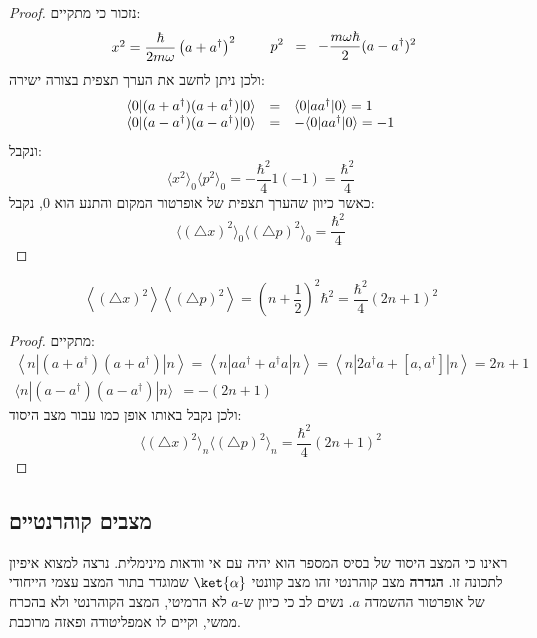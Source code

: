 \documentclass{tstextbook}
\begin{document}
\begin{proof}
נזכור כי מתקיים:
$$\begin{array}{c c l}{{x^{2}}}={{\displaystyle\frac{\hbar}{2m\omega}\left( a+a^{\dagger} \right)^{2}}}\end{array}\qquad p^{2}\;\;=\;\;-\frac{m\omega\hbar}2(a-a^{\dagger})^{2}$$
ולכן ניתן לחשב את הערך תצפית בצורה ישירה:
$$\begin{array}{l c l}{{\langle0|(a+a^{\dagger})(a+a^{\dagger})|0\rangle}}&{{=}}&{{\langle0|a a^{\dagger}|0\rangle=1}}\\ {{\langle0|(a-a^{\dagger})(a-a^{\dagger})|0\rangle}}&{{=}}&{{-\langle0|a a^{\dagger}|0\rangle=-1}}\end{array}$$
ונקבל:
$$\langle x^{2}\rangle_{0}\langle p^{2}\rangle_{0}=-\frac{\hbar^{2}}{4}1(-1)=\frac{\hbar^{2}}{4}$$
כאשר כיוון שהערך תצפית של אופרטור המקום והתנע הוא 0, נקבל:
$$\langle(\triangle x)^{2}\rangle_{0}\langle(\triangle p)^{2}\rangle_{0}=\frac{\hbar^{2}}{4}$$

\end{proof}
\begin{proposition}
$$\left\langle \left( \triangle x \right)^{2} \right\rangle\left\langle \left( \triangle p \right)^{2} \right\rangle=\left(n+\frac{1}{2}\right)^{2}\hbar^{2}=\frac{\hbar^{2}}{4}(2n+1)^{2}$$

\end{proposition}
\begin{proof}
מתקיים:
\begin{gather*}\left\langle  n|\left( a+a^{\dagger} \right)\left( a+a^{\dagger} \right)|n \right\rangle=\left\langle  n|a a^{\dagger}+a^{\dagger}a|n \right\rangle=\left\langle  n|2a^{\dagger}a+\left[ a,a^{\dagger} \right]|n \right\rangle=2n+1  \\\langle n|(a-a^{\dagger})(a-a^{\dagger})|n\rangle\ \ =-(2n+1)
\end{gather*}
ולכן נקבל באותו אופן כמו עבור מצב היסוד:
$$\langle(\triangle x)^{2}\rangle_{n}\langle(\triangle p)^{2}\rangle_{n}=\frac{\hbar^{2}}{4}(2n+1)^{2}$$

\end{proof}
\subsection{מצבים קוהרנטיים}

ראינו כי המצב היסוד של בסיס המספר הוא יהיה עם אי וודאות מינימלית. נרצה למצוא איפיון לתכונה זו.
\textbf{הגדרה} מצב קוהרנטי
זהו מצב קוונטי \(\ket{\alpha}\) שמוגדר בתור המצב עצמי הייחודי של אופרטור ההשמדה \(a\). נשים לב כי כיוון ש-\(a\) לא הרמיטי, המצב הקוהרנטי ולא בהכרח ממשי, וקיים לו אמפליטודה ופאזה מרוכבת.
\end{document}
